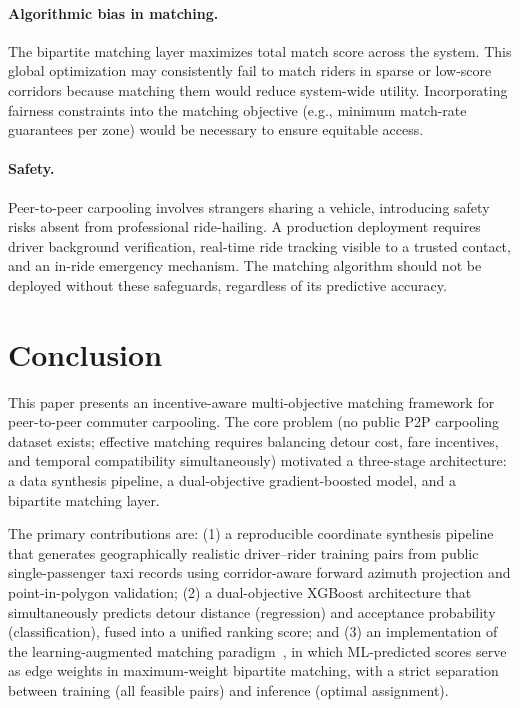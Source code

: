 \documentclass{article}
\begin{document}
\paragraph{Algorithmic bias in matching.}
The bipartite matching layer maximizes total match score across the system. This global optimization may consistently fail to match riders in sparse or low-score corridors because matching them would reduce system-wide utility. Incorporating fairness constraints into the matching objective (e.g., minimum match-rate guarantees per zone) would be necessary to ensure equitable access.

\paragraph{Safety.}
Peer-to-peer carpooling involves strangers sharing a vehicle, introducing safety risks absent from professional ride-hailing. A production deployment requires driver background verification, real-time ride tracking visible to a trusted contact, and an in-ride emergency mechanism. The matching algorithm should not be deployed without these safeguards, regardless of its predictive accuracy.


\section{Conclusion}
\label{sec:conclusion}

This paper presents an incentive-aware multi-objective matching framework for peer-to-peer commuter carpooling. The core problem (no public P2P carpooling dataset exists; effective matching requires balancing detour cost, fare incentives, and temporal compatibility simultaneously) motivated a three-stage architecture: a data synthesis pipeline, a dual-objective gradient-boosted model, and a bipartite matching layer.

The primary contributions are: (1) a reproducible coordinate synthesis pipeline that generates geographically realistic driver--rider training pairs from public single-passenger taxi records using corridor-aware forward azimuth projection and point-in-polygon validation; (2) a dual-objective XGBoost architecture that simultaneously predicts detour distance (regression) and acceptance probability (classification), fused into a unified ranking score; and (3) an implementation of the learning-augmented matching paradigm~\citep{bjorck2021learning}, in which ML-predicted scores serve as edge weights in maximum-weight bipartite matching, with a strict separation between training (all feasible pairs) and inference (optimal assignment).
\end{document}
